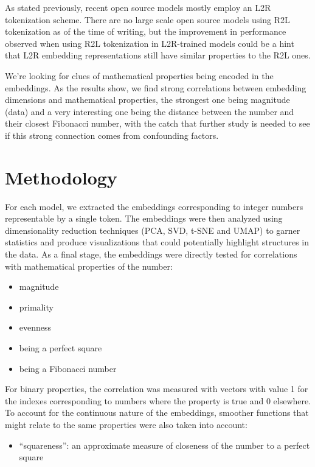 \documentclass[
  a4paper, twoside, 10pt, titlepage]{book}
\providecommand{\tightlist}{%
  \setlength{\itemsep}{0pt}\setlength{\parskip}{0pt}}
\begin{document}
As stated previously, recent open source models mostly employ an L2R
tokenization scheme. There are no large scale open source models using
R2L tokenization as of the time of writing, but the improvement in
performance observed when using R2L tokenization in L2R-trained models
could be a hint that L2R embedding representations still have similar
properties to the R2L ones.

We're looking for clues of mathematical properties being encoded in the
embeddings. As the results show, we find strong correlations between
embedding dimensions and mathematical properties, the strongest one
being magnitude (data) and a very interesting one being the distance
between the number and their closest Fibonacci number, with the catch
that further study is needed to see if this strong connection comes from
confounding factors.

\section{Methodology}\label{methodology}

For each model, we extracted the embeddings corresponding to integer
numbers representable by a single token. The embeddings were then
analyzed using dimensionality reduction techniques (PCA, SVD, t-SNE and
UMAP) to garner statistics and produce visualizations that could
potentially highlight structures in the data. As a final stage, the
embeddings were directly tested for correlations with mathematical
properties of the number:

\begin{itemize}
\tightlist
\item
  magnitude
\item
  primality
\item
  evenness
\item
  being a perfect square
\item
  being a Fibonacci number
\end{itemize}

For binary properties, the correlation was measured with vectors with
value 1 for the indexes corresponding to numbers where the property is
true and 0 elsewhere. To account for the continuous nature of the
embeddings, smoother functions that might relate to the same properties
were also taken into account:

\begin{itemize}
\tightlist
\item
  ``squareness'': an approximate measure of closeness of the number to a
  perfect square
\end{itemize}
\end{document}

